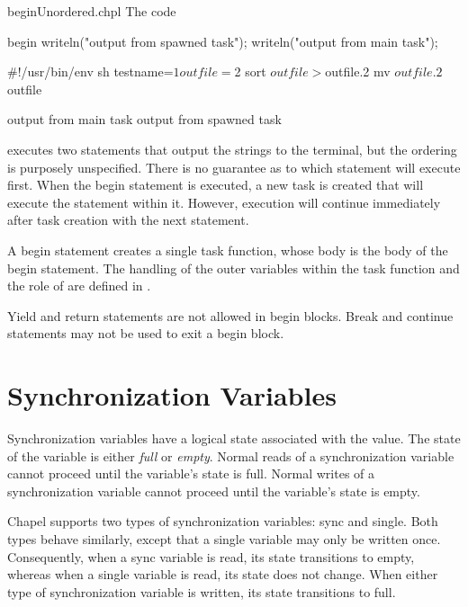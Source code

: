 \begin{chapelexample}{beginUnordered.chpl}
The code
\begin{chapel}
begin writeln("output from spawned task");
writeln("output from main task");
\end{chapel}
\begin{chapelprediff}
\#!/usr/bin/env sh
testname=$1
outfile=$2
sort $outfile > $outfile.2
mv $outfile.2 $outfile
\end{chapelprediff}
\begin{chapeloutput}
output from main task
output from spawned task
\end{chapeloutput}
executes two  statements that output the strings to the
terminal, but the ordering is purposely unspecified.  There is no
guarantee as to which statement will execute first.  When the
begin statement is executed, a new task is created that will execute
the  statement within it.  However, execution will
continue immediately after task creation with the next statement.
\end{chapelexample}

A begin statement creates a single task function,
whose body is the body of the begin statement.
The handling of the outer variables within the task function and
the role of  are defined in .

Yield and return statements are not allowed in begin blocks.  Break
and continue statements may not be used to exit a begin block.

%
%

\section{Synchronization Variables}
\label{Synchronization_Variables}

Synchronization variables have a logical state associated with the
value.  The state of the variable is either {\em full} or {\em empty}.
Normal reads of a synchronization variable cannot proceed until the
variable's state is full.  Normal writes of a synchronization variable
cannot proceed until the variable's state is empty.

Chapel supports two types of synchronization variables: sync and
single.  Both types behave similarly, except that a single variable
may only be written once.  Consequently, when a sync variable is read,
its state transitions to empty, whereas when a single variable is
read, its state does not change.  When either type of synchronization
variable is written, its state transitions to full.

